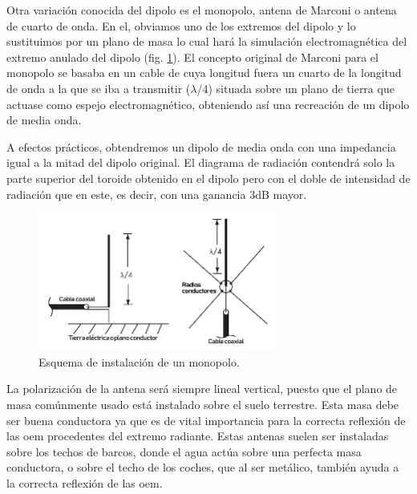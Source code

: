 \par Otra variación conocida del dipolo es el monopolo, antena de Marconi o antena de cuarto de onda. En el, obviamos uno de los extremos del dipolo y lo sustituimos por un plano de masa lo cual hará la simulación electromagnética del extremo anulado del dipolo (fig. \ref{fig:monopolo}). El concepto original de Marconi para el monopolo se basaba en un cable de cuya longitud fuera un cuarto de la longitud de onda a la que se iba a transmitir ($\lambda$/4) situada sobre un plano de tierra que actuase como espejo electromagnético, obteniendo así una recreación de un dipolo de media onda.
\\
\par A efectos prácticos, obtendremos un dipolo de media onda con una impedancia igual a la mitad del dipolo original. El diagrama de radiación contendrá solo la parte superior del toroide obtenido en el dipolo pero con el doble de intensidad de radiación que en este, es decir, con una ganancia 3dB mayor.
\\
\begin{figure}[h]
    \centering
        \includegraphics[width=0.7\textwidth]{archivos/monopolo/monoesquema}
        \caption{Esquema de instalación de un monopolo. \citep{Frenzel2013}}
        \label{fig:monopolo}
\end{figure}

\par La polarización de la antena será siempre lineal vertical, puesto que el plano de masa comúnmente usado está instalado sobre el suelo terrestre. Esta masa debe ser buena conductora ya que es de vital importancia para la correcta reflexión de las \gls{oem} procedentes del extremo radiante. Estas antenas suelen ser instaladas sobre los techos de barcos, donde el agua actúa sobre una perfecta masa conductora, o sobre el techo de los coches, que al ser metálico, también ayuda a la correcta reflexión de las \gls{oem}. 
\\

